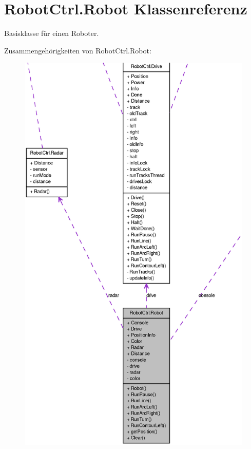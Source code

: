 \hypertarget{class_robot_ctrl_1_1_robot}{
\section{RobotCtrl.Robot Klassenreferenz}
\label{class_robot_ctrl_1_1_robot}
}


Basisklasse f\"{u}r einen Roboter.  




Zusammengehörigkeiten von RobotCtrl.Robot:\nopagebreak
\begin{figure}[H]
\begin{center}
\leavevmode
\includegraphics[width=400pt]{class_robot_ctrl_1_1_robot__coll__graph}
\end{center}
\end{figure}
